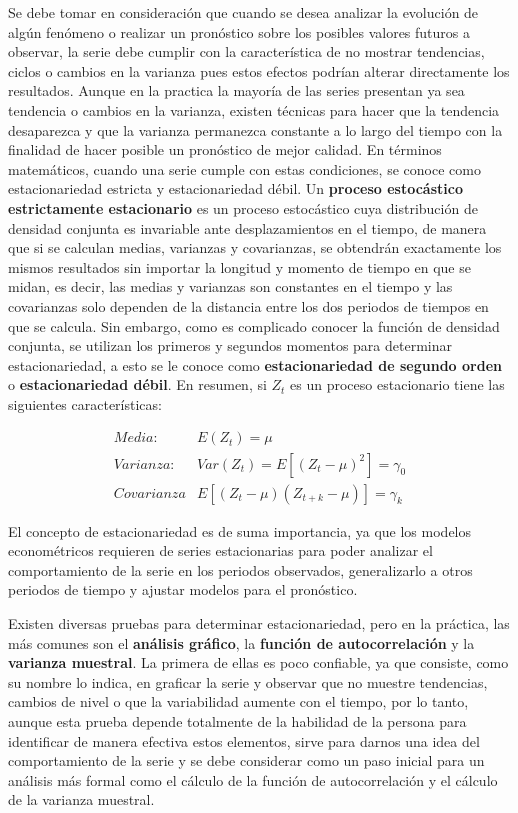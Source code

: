Se debe tomar en consideración que cuando se desea analizar la evolución de algún fenómeno o realizar un pronóstico sobre los posibles valores futuros a observar, la serie debe cumplir con la característica de no mostrar tendencias, ciclos o cambios en la varianza  pues estos efectos podrían alterar directamente los resultados. Aunque en la practica la mayoría de las series presentan ya sea tendencia o cambios en la varianza, existen técnicas para hacer que la tendencia desaparezca y que la varianza permanezca constante a lo largo del tiempo con la finalidad de hacer posible un pronóstico de mejor calidad. En términos matemáticos, cuando una serie cumple con estas condiciones, se conoce como estacionariedad estricta y estacionariedad débil. Un \textbf{proceso estocástico estrictamente estacionario} es un proceso estocástico cuya distribución de densidad conjunta es invariable ante desplazamientos en el tiempo, de manera que si se calculan medias, varianzas y covarianzas, se obtendrán exactamente los mismos resultados sin importar la longitud y momento de tiempo en que se midan, es decir, las medias y varianzas son constantes en el tiempo y las covarianzas  solo dependen de la distancia entre los dos periodos de tiempos en que se calcula. Sin embargo, como es complicado conocer la función de densidad conjunta, se utilizan los primeros y segundos momentos para determinar estacionariedad, a esto se le conoce como \textbf{estacionariedad de segundo orden } o \textbf{estacionariedad débil}. En resumen, si $Z_t$ es un proceso estacionario tiene las siguientes características:

\begin{eqnarray}
        Media: & E(Z_t)=\mu  \nonumber \\ 
        Varianza:  & Var(Z_t)=E[(Z_t- \mu )^2]=\gamma_0   \\ 
        Covarianza & E[(Z_t-\mu)(Z_{t+k}-\mu)]=\gamma_k  \nonumber 
\end{eqnarray} 

El concepto de estacionariedad es de suma importancia, ya que los modelos econométricos requieren de series estacionarias para poder analizar el comportamiento de la serie en los periodos observados, generalizarlo a otros periodos de tiempo y ajustar modelos para el pronóstico.\newline

Existen diversas pruebas para determinar estacionariedad, pero en la práctica, las más comunes son el \textbf{análisis gráfico}, la \textbf{función de autocorrelación} y la \textbf{varianza muestral}. La primera de ellas es poco confiable, ya que consiste, como su nombre lo indica, en graficar la serie y observar que no muestre tendencias, cambios de nivel o que la variabilidad aumente con el tiempo, por lo tanto, aunque esta prueba depende totalmente de la habilidad de la persona para identificar de manera efectiva estos elementos, sirve para darnos una idea del comportamiento de la serie y se debe considerar como un paso inicial para un análisis más formal como el cálculo de la función de autocorrelación y el cálculo de la varianza muestral.\newline

